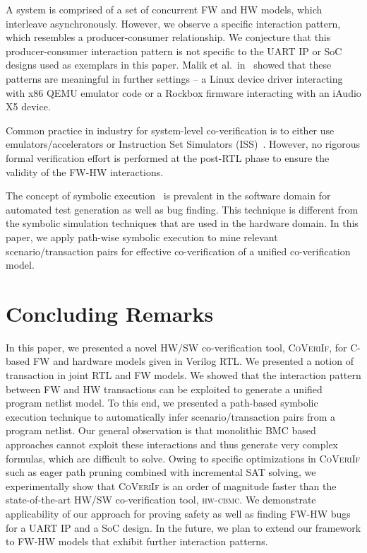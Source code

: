 \documentclass[sigconf]{acmart}
\newcommand{\tool}[1]{\textsc{#1}\xspace}
\newcommand{\hwcbmcv}{\tool{hw-cbmc}}
\newcommand{\verifox}{\tool{CoVeriIf}}
\begin{document}
A system is comprised of a set of concurrent FW and HW models, which
interleave asynchronously.  However, we observe a specific interaction
pattern, which resembles a producer-consumer relationship.  We conjecture
that this producer-consumer interaction pattern is not specific to the UART
IP or SoC designs used as exemplars in this paper.  Malik et
al.~in~\cite{hvc} showed that these patterns are meaningful in further
settings -- a Linux device driver interacting with x86 QEMU emulator code or
a Rockbox firmware interacting with an iAudio X5 device.

Common practice in industry for system-level co-verification is to 
either use emulators/accelerators or Instruction Set Simulators 
(ISS)~\cite{coverif-book}.  However, no rigorous formal verification 
effort is performed at the post-RTL phase to ensure the validity of the
FW-HW interactions.  

The concept of symbolic execution~\cite{DBLP:journals/tse/Clarke76,
DBLP:conf/pldi/GodefroidKS05, DBLP:conf/osdi/CadarDE08} is prevalent in the
software domain for automated test generation as well as bug finding.  This
technique is different from the symbolic simulation techniques that are used
in the hardware domain.  In this paper, we apply path-wise symbolic execution
to mine relevant scenario/transaction pairs for effective co-verification of 
a unified co-verification model.  

\section{Concluding Remarks}

In this paper, we presented a novel HW/SW co-verification tool, \verifox,
for C-based FW and hardware models given in Verilog RTL.  We presented a
notion of transaction in joint RTL and FW models.  We showed that the
interaction pattern between FW and HW transactions can be exploited to
generate a unified program netlist model.  To this end, we presented a
path-based symbolic execution technique to automatically infer
scenario/transaction pairs from a program netlist.  Our general observation
is that monolithic BMC based approaches cannot exploit these interactions
and thus generate very complex formulas, which are difficult to solve. 
Owing to specific optimizations in \verifox such as eager path pruning
combined with incremental SAT solving, we experimentally show that \verifox
is an order of magnitude faster than the state-of-the-art HW/SW
co-verification tool, \hwcbmcv.  We demonstrate applicability of our
approach for proving safety as well as finding FW-HW bugs for a UART IP and
a SoC design.  In the future, we plan to extend our framework to FW-HW
models that exhibit further interaction patterns.

%

 
\end{document}
